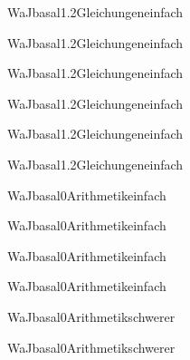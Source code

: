 \documentclass[12pt]{article}
\begin{document}
\begin{Add}{WaJ}{basal1.2}{Gleichungen}{einfach}
\solution{ }
\end{Add}
\begin{Add}{WaJ}{basal1.2}{Gleichungen}{einfach}
\end{Add}

\begin{Add}{WaJ}{basal1.2}{Gleichungen}{einfach}
\solution{ }
\end{Add}
\begin{Add}{WaJ}{basal1.2}{Gleichungen}{einfach}
\end{Add}

\begin{Add}{WaJ}{basal1.2}{Gleichungen}{einfach}
\solution{ }
\end{Add}
\begin{Add}{WaJ}{basal1.2}{Gleichungen}{einfach}
\end{Add}

\begin{Add}{WaJ}{basal0}{Arithmetik}{einfach}
\solution{ }
\end{Add}
\begin{Add}{WaJ}{basal0}{Arithmetik}{einfach}
\end{Add}

\begin{Add}{WaJ}{basal0}{Arithmetik}{einfach}
\solution{ }
\end{Add}
\begin{Add}{WaJ}{basal0}{Arithmetik}{einfach}
\end{Add}

\begin{Add}{WaJ}{basal0}{Arithmetik}{schwerer}
\solution{ }
\end{Add}
\begin{Add}{WaJ}{basal0}{Arithmetik}{schwerer}
\end{Add}
\end{document}
